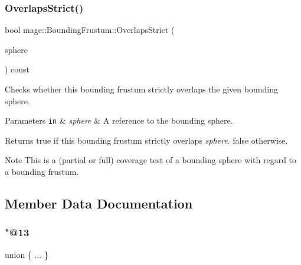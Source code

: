 \subsubsection{\texorpdfstring{Overlaps\+Strict()}{OverlapsStrict()}\hspace{0.1cm}{\footnotesize\ttfamily [2/2]}}
{\footnotesize\ttfamily bool mage\+::\+Bounding\+Frustum\+::\+Overlaps\+Strict (\begin{DoxyParamCaption}\item[{const \hyperlink{classmage_1_1_bounding_sphere}{Bounding\+Sphere} \&}]{sphere }\end{DoxyParamCaption}) const\hspace{0.3cm}{\ttfamily [noexcept]}}

Checks whether this bounding frustum strictly overlaps the given bounding sphere.


\begin{DoxyParams}[1]{Parameters}
\mbox{\tt in}  & {\em sphere} & A reference to the bounding sphere. \\
\hline
\end{DoxyParams}
\begin{DoxyReturn}{Returns}
{\ttfamily true} if this bounding frustum strictly overlaps {\itshape sphere}. {\ttfamily false} otherwise. 
\end{DoxyReturn}
\begin{DoxyNote}{Note}
This is a (partial or full) coverage test of a bounding sphere with regard to a bounding frustum. 
\end{DoxyNote}


\subsection{Member Data Documentation}
\hypertarget{classmage_1_1_bounding_frustum_a0a573834d79439130a81b59e5115d3bf}{}\label{classmage_1_1_bounding_frustum_a0a573834d79439130a81b59e5115d3bf} 
\subsubsection{\texorpdfstring{"@13}{@13}}
{\footnotesize\ttfamily union \{ ... \} \hspace{0.3cm}{\ttfamily [private]}}

\hypertarget{classmage_1_1_bounding_frustum_ae416db4ef5c2fc3eb2e2f25f6e45e747}{}\label{classmage_1_1_bounding_frustum_ae416db4ef5c2fc3eb2e2f25f6e45e747} 
